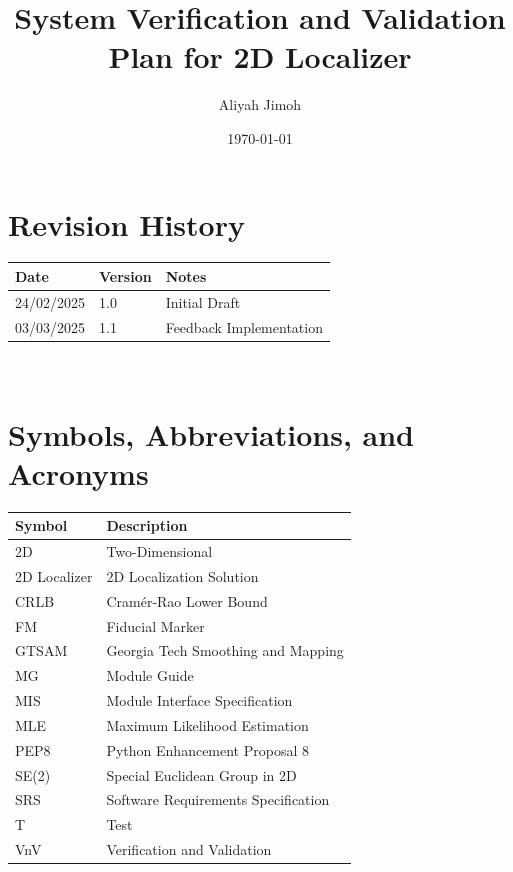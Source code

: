 \documentclass[12pt, titlepage]{article}
\begin{document}
\title{System Verification and Validation Plan for 2D Localizer} 
\author{Aliyah Jimoh}
\date{\today}
	
\maketitle


\section*{Revision History}

\begin{tabularx}{\textwidth}{p{3cm}p{2cm}X}
\toprule {\bf Date} & {\bf Version} & {\bf Notes}\\
\midrule
24/02/2025 & 1.0 & Initial Draft\\
03/03/2025 & 1.1 & Feedback Implementation\\
\bottomrule
\end{tabularx}

~\\

\newpage

\tableofcontents

\listoftables

\listoffigures
{}

\newpage

\section{Symbols, Abbreviations, and Acronyms}

\renewcommand{\arraystretch}{1.2}
\begin{tabular}{l l} 
  \toprule		
  \textbf{Symbol} & \textbf{Description}\\
  \midrule 
  2D & Two-Dimensional \\
  2D Localizer & 2D Localization Solution\\
  CRLB & Cram\'er-Rao Lower Bound\\
  FM & Fiducial Marker \\
  GTSAM & Georgia Tech Smoothing and Mapping\\
  MG & Module Guide \\
  MIS & Module Interface Specification \\
  MLE & Maximum Likelihood Estimation\\
  PEP8 & Python Enhancement Proposal 8 \\
  SE(2) & Special Euclidean Group in 2D \\
  SRS & Software Requirements Specification\\
  T & Test\\
  VnV & Verification and Validation\\
  \bottomrule
\end{tabular}\\
\end{document}
